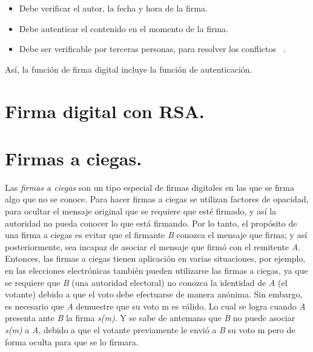 	\begin{itemize}
		\item Debe verificar el autor, la fecha y hora de la firma.
		\item Debe autenticar el contenido en el momento de la firma.
		\item Debe ser verificable por terceras personas, para resolver los conflictos ~\cite{modes}.
	\end{itemize}

Así, la función de firma digital incluye la función de autenticación.


\section{Firma digital con RSA. }



\section{Firmas a ciegas. }

Las \textit{firmas a ciegas} son un tipo especial de firmas digitales en las que se firma algo que no se conoce. Para hacer firmas a ciegas se utilizan factores de opacidad, para ocultar el mensaje original que se requiere que esté firmado, y así la autoridad no pueda conocer lo que está firmando.
Por lo tanto, el propósito de una firma a ciegas es evitar que el firmante \textit{B} conozca el mensaje que firma; y así posteriormente, sea incapaz de asociar el mensaje que firmó con el remitente \textit{A}. Entonces, las firmas a ciegas tienen aplicación en varias situaciones, por ejemplo, en las elecciones electrónicas también pueden utilizarse las firmas a ciegas, ya que se requiere que \textit{B} (una autoridad electoral) no conozca la identidad de \textit{A} (el votante) debido a que el voto debe efectuarse de manera anónima. Sin embargo, es necesario que \textit{A} demuestre que su voto m es válido. Lo cual se logra cuando \textit{A} presenta ante \textit{B} la firma \textit{s(m)}. Y se sabe de antemano que \textit{B} no puede asociar \textit{s(m)} a \textit{A}, debido a que el votante previamente le envió a \textit{B} su voto m pero de forma oculta para que se lo firmara. ~\cite{ciegas}


